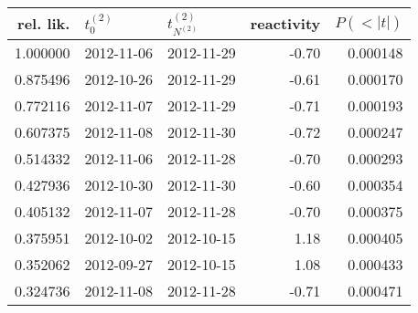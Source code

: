 \begin{tabular}{rllrr}
\toprule
 rel. lik. & $t_0^{(2)}$ & $t^{(2)}_{N^{(2)}}$ & reactivity &  $P(<|t|)$ \\
\midrule
  1.000000 &  2012-11-06 &          2012-11-29 &      -0.70 &   0.000148 \\
  0.875496 &  2012-10-26 &          2012-11-29 &      -0.61 &   0.000170 \\
  0.772116 &  2012-11-07 &          2012-11-29 &      -0.71 &   0.000193 \\
  0.607375 &  2012-11-08 &          2012-11-30 &      -0.72 &   0.000247 \\
  0.514332 &  2012-11-06 &          2012-11-28 &      -0.70 &   0.000293 \\
  0.427936 &  2012-10-30 &          2012-11-30 &      -0.60 &   0.000354 \\
  0.405132 &  2012-11-07 &          2012-11-28 &      -0.70 &   0.000375 \\
  0.375951 &  2012-10-02 &          2012-10-15 &       1.18 &   0.000405 \\
  0.352062 &  2012-09-27 &          2012-10-15 &       1.08 &   0.000433 \\
  0.324736 &  2012-11-08 &          2012-11-28 &      -0.71 &   0.000471 \\
\bottomrule
\end{tabular}
